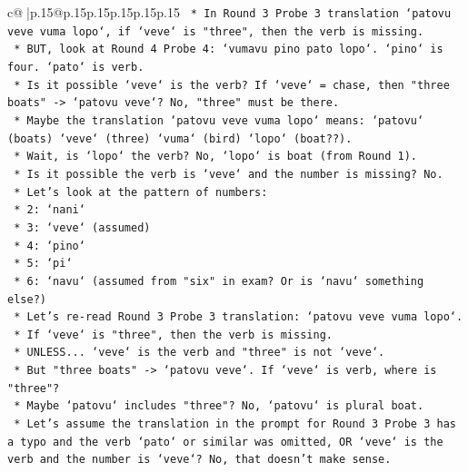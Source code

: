 \documentclass{article}
\begin{document}
{\begin{supertabular}{c@{$\;$}|p{.15\linewidth}@{}p{.15\linewidth}p{.15\linewidth}p{.15\linewidth}p{.15\linewidth}p{.15\linewidth}}
{{{\texttt{                        *   In Round 3 Probe 3 translation `patovu veve vuma lopo`, if `veve` is "three", then the verb is missing.} \\
\texttt{                        *   BUT, look at Round 4 Probe 4: `vumavu pino pato lopo`. `pino` is four. `pato` is verb.} \\
\texttt{                        *   Is it possible `veve` is the verb? If `veve` = chase, then "three boats" {-}> `patovu veve`? No, "three" must be there.} \\
\texttt{                        *   Maybe the translation `patovu veve vuma lopo` means: `patovu` (boats) `veve` (three) `vuma` (bird) `lopo` (boat??).} \\
\texttt{                        *   Wait, is `lopo` the verb? No, `lopo` is boat (from Round 1).} \\
\texttt{                        *   Is it possible the verb is `veve` and the number is missing? No.} \\
\texttt{                        *   Let's look at the pattern of numbers:} \\
\texttt{                            *   2: `nani`} \\
\texttt{                            *   3: `veve` (assumed)} \\
\texttt{                            *   4: `pino`} \\
\texttt{                            *   5: `pi`} \\
\texttt{                            *   6: `navu` (assumed from "six" in exam? Or is `navu` something else?)} \\
\texttt{                        *   Let's re{-}read Round 3 Probe 3 translation: `patovu veve vuma lopo`.} \\
\texttt{                        *   If `veve` is "three", then the verb is missing.} \\
\texttt{                        *   UNLESS... `veve` is the verb and "three" is not `veve`.} \\
\texttt{                        *   But "three boats" {-}> `patovu veve`. If `veve` is verb, where is "three"?} \\
\texttt{                        *   Maybe `patovu` includes "three"? No, `patovu` is plural boat.} \\
\texttt{                        *   Let's assume the translation in the prompt for Round 3 Probe 3 has a typo and the verb `pato` or similar was omitted, OR `veve` is the verb and the number is `veve`? No, that doesn't make sense.} \\
}}}
\end{supertabular}}
\end{document}
